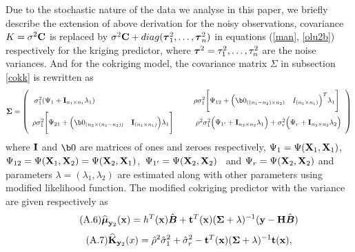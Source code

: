 \begin{acknowledgements}
Due to the stochastic nature of the data we analyse in this paper, we briefly describe the extension of above derivation for the noisy observations, covariance $K=\sigma^2{\bf C}$ is replaced by $ \sigma^2{\bf C}+diag({{\boldsymbol{\tau}}}^2_1,\ldots,{{\boldsymbol{\tau}}}^2_n)$ in equations (\ref{man}, \ref{olu2b}) respectively for the kriging predictor, where ${{\boldsymbol{\tau}}}^2=\tau^2_1,\ldots,\tau^2_n$ are the noise variances. And for the cokriging model, the covariance matrix $\Sigma$ in subsection \ref{cokk} is rewritten as
\[\bSigma=
\left(
\begin{array}{cc}
\sigma_1^2(\Psi_1 +\bI_{n_1\times n_1}\lambda_1) ~~~~~~~~~~~~~~~~~~~~~~~~~~~~~~~~~~~~~~~~\rho\sigma_1^2\Bigg[\Psi_{12}+\Big(\b0_{((n_1-n_2) \times n_2)}~~~I_{(n_1\times n_1)}\Big)^T\lambda_1\Bigg] 
\\
\rho\sigma_1^2\Bigg[\Psi_{21}+\Big(\b0_{(n_2 \times (n_1-n_2))}~~~\bI_{(n_1\times n_1)}\Big)\lambda_1\Bigg] ~~~~~~~~~\rho^2\sigma_1^2\Big(\Psi_{1'} +\bI_{n_2\times n_2}\lambda_1\Big) + \sigma_r^2\Big(\Psi_r +\bI_{n_2\times n_2}\lambda_2\Big)
\end{array} 
\right)
\]
where ${\mathbf{I}}$ and $\b0$ are matrices of ones and zeroes respectively, $\Psi_1=\Psi({\bf X}_1,{\bf X}_1)$, ~ $\Psi_{12}=\Psi({\bf X}_1,{\bf X}_2)=\Psi({\bf X}_2,{\bf X}_1)$,~$\Psi_{1'}=\Psi({\bf X}_2,{\bf X}_2)$~ and $\Psi_r=\Psi({\bf X}_2,{\bf X}_2)$ and parameters $\lambda=(\lambda_1, \lambda_2)$ are estimated along with other parameters using modified likelihood function. The modified cokriging predictor with the variance are given respectively as
\begin{equation}\tag{A.6}\label{cokmean}
\widehat{{{\boldsymbol{\mu}}}}_{{\bf y}_2}{({\bf x})}= h^T({\bf x}){\hat{\boldsymbol{B}}}+ {\bf t}^T({\bf x})({\boldsymbol{\Sigma}}+\lambda)^{-1}({\bf y} -{\bf H}{\hat{\boldsymbol{B}}})
\end{equation}
\begin{equation}\tag{A.7}\label{cokvar}
\widehat {{\mathbf{K}}}_{{\bf y}_2}(x)=\hat\rho^2\hat \sigma_1^2+ \hat\sigma_r^2 - {\bf t}^T({\bf x})({\boldsymbol{\Sigma}}+\lambda)^{-1}{\bf t}({\bf x}),
\end{equation}



\end{acknowledgements}

